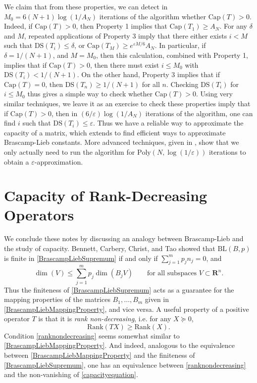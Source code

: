 \documentclass[12pt]{article}
\begin{document}
%
We claim that from these properties, we can detect in $M_0 = 6(N+1) \log(1/A_N)$ iterations of the algorithm whether $\text{Cap}(T) > 0$. Indeed, if $\text{Cap}(T) > 0$, then Property 1 implies that $\text{Cap}(T_1) \geq A_N$. For any $\delta$ and $M$, repeated applications of Property 3 imply that there either exists $i < M$ such that $\text{DS}(T_i) \leq \delta$, or $\text{Cap}(T_M) \geq e^{\varepsilon M / 6} A_N$. In particular, if $\delta = 1/(N+1)$, and $M = M_0$, then this calculation, combined with Property 1, implies that if $\text{Cap}(T) > 0$, then there must exist $i \leq M_0$ with $\text{DS}(T_i) < 1/(N+1)$. On the other hand, Property 3 implies that if $\text{Cap}(T) = 0$, then $\text{DS}(T_n) \geq 1/(N+1)$ for all $n$. Checking $\text{DS}(T_i)$ for $i \leq M_0$ thus gives a simple way to check whether $\text{Cap}(T) > 0$. Using very similar techniques, we leave it as an exercise to check these properties imply that if $\text{Cap}(T) > 0$, then in $(6/\varepsilon) \log(1/A_N)$ iterations of the algorithm, one can find $i$ such that $\text{DS}(T_i) \leq \varepsilon$. Thus we have a reliable way to approximate the capacity of a matrix, which \cite{ggow} extends to find efficient ways to approximate Brascamp-Lieb constants. More advanced techniques, given in \cite{ostaa}, show that we only actually need to run the algorithm for $\text{Poly}(N,\log(1/\varepsilon))$ iterations to obtain a $\varepsilon$-approximation.

\section{Capacity of Rank-Decreasing Operators}

We conclude these notes by discussing an analogy between Brascamp-Lieb and the study of capacity. Bennett, Carbery, Christ, and Tao \cite{bcct} showed that $\text{BL}(B,p)$ is finite in \eqref{BrascampLiebSupremum} if and only if $\sum_{j = 1}^m p_j n_j = 0$, and
%
\begin{equation} \label{BrascampLiebMappingProperty}
    \dim(V) \leq \sum_{j = 1}^m p_j \dim(B_j V)\quad\quad \text{for all subspaces $V \subset \mathbf{R}^n$}.
\end{equation}
%
Thus the finiteness of \eqref{BrascampLiebSupremum} acts as a guarantee for the mapping properties of the matrices $B_1, \dots, B_m$ given in \eqref{BrascampLiebMappingProperty}, and vice versa. A useful property of a positive operator $T$ is that it is \emph{rank non-decreasing}, i.e. for any $X \succeq 0$,
%
\begin{equation} \label{ranknondecreasing}
    \text{Rank}(TX) \geq \text{Rank}(X).
\end{equation}
%
Condition \eqref{ranknondecreasing} seems somewhat similar to \eqref{BrascampLiebMappingProperty}. And indeed, analogous to the equivalence between \eqref{BrascampLiebMappingProperty} and the finiteness of \eqref{BrascampLiebSupremum}, one has an equivalence between \eqref{ranknondecreasing} and the non-vanishing of \eqref{capacityequation}.
\end{document}
